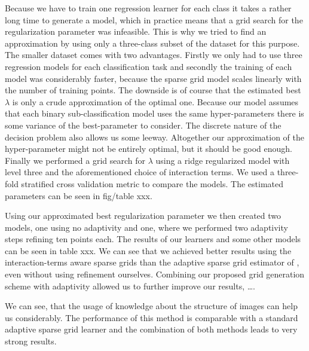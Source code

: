 Because we have to train one regression learner for each class it takes a rather
long time to generate a model, which in practice means that a grid search for
the regularization parameter was infeasible.
This is why we tried to find an approximation by using only a three-class subset
of the dataset for this purpose.
The smaller dataset comes with two advantages.
Firstly we only had to use three regression models for each classification
task and secondly the training of each model was considerably faster, because
the sparse grid model scales linearly with the number of training points.
The downside is of course that the estimated best \(\lambda\) is only a crude
approximation of the optimal one.
Because our model assumes that each binary sub-classification model uses the
same hyper-parameters there is some variance of the best-parameter to consider.
The discrete nature of the decision problem also allows us some leeway.
Altogether our approximation of the hyper-parameter might not be entirely
optimal, but it should be good enough.
Finally we performed a grid search for \(\lambda\) using a ridge regularized model with level
three and the aforementioned choice of interaction terms.
We used a three-fold stratified cross validation metric to compare the models.
The estimated parameters can be seen in fig/table xxx.

Using our approximated best regularization parameter we then created two models,
one using no adaptivity and one, where we performed two adaptivity steps
refining ten points each.
The results of our learners and some other models can be seen in table xxx.
We can see that we achieved better results using the interaction-terms aware
sparse grids than the adaptive sparse grid estimator of \cite{spatAdaptGrid},
even without using refinement ourselves.
Combining our proposed grid generation scheme with adaptivity allowed us to
further improve our results, \ldots.

We can see, that the usage of knowledge about the structure of images can help
us considerably.
The performance of this method is comparable with a standard adaptive sparse
grid learner and the combination of both methods leads to very strong results.



